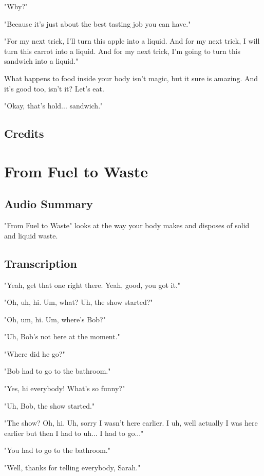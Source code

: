 "Why?"

"Because it's just about the best tasting job you can have."

"For my next trick, I'll turn this apple into a liquid. And for my next trick, I will turn this carrot into a liquid. And for my next trick, I'm going to turn this sandwich into a liquid."

What happens to food inside your body isn't magic, but it sure is amazing. And it's good too, isn't it? Let's eat.

"Okay, that's hold... sandwich."

\subsection{Credits}

\section{From Fuel to Waste}

\subsection{Audio Summary}

"From Fuel to Waste" looks at the way your body makes and disposes of solid and liquid waste.

\subsection{Transcription}

"Yeah, get that one right there. Yeah, good, you got it."

"Oh, uh, hi. Um, what? Uh, the show started?"

"Oh, um, hi. Um, where's Bob?"

"Uh, Bob's not here at the moment."

"Where did he go?"

"Bob had to go to the bathroom."

"Yes, hi everybody! What's so funny?"

"Uh, Bob, the show started."

"The show? Oh, hi. Uh, sorry I wasn't here earlier. I uh, well actually I was here earlier but then I had to uh... I had to go..."

"You had to go to the bathroom."

"Well, thanks for telling everybody, Sarah."

